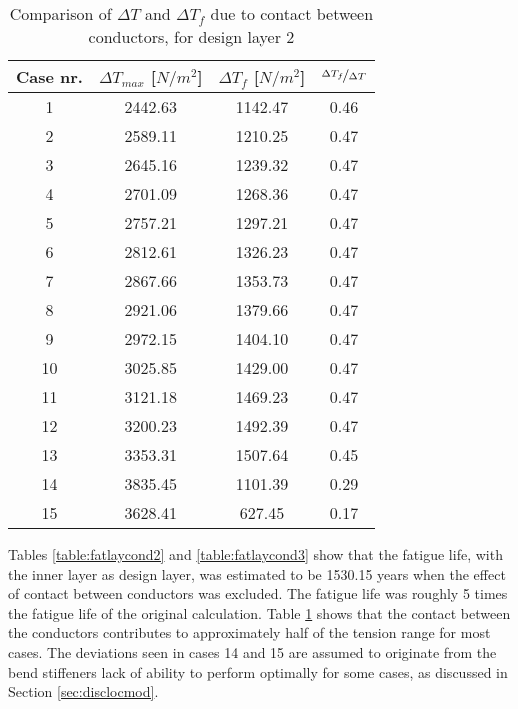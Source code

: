 \begin{table} [H]
\centering
\begin{tabular}{ |c|c|c|c|}
\hline
    Case nr.  & $\Delta T_{max}$ [$N/m^2$] & $\Delta T_f$ [$N/m^2$] & $\nicefrac{\Delta T_f}{\Delta T}$ \\ 
 \hline
 \hline
    1 & 2442.63 & 1142.47 & 0.46  \\ 
    2 & 2589.11 & 1210.25 & 0.47   \\ 
    3 & 2645.16 & 1239.32 & 0.47   \\ 
    4 & 2701.09 & 1268.36 & 0.47   \\
    5 & 2757.21 & 1297.21 & 0.47   \\ 
    6 & 2812.61 & 1326.23 & 0.47  \\ 
    7 & 2867.66 & 1353.73 & 0.47   \\ 
    8 & 2921.06 & 1379.66 & 0.47  \\ 
    9 & 2972.15 & 1404.10 & 0.47  \\ 
    10 & 3025.85 & 1429.00 & 0.47   \\ 
    11 & 3121.18 & 1469.23 & 0.47   \\ 
    12 & 3200.23 & 1492.39 & 0.47  \\ 
    13 & 3353.31 & 1507.64 & 0.45   \\ 
    14 & 3835.45 & 1101.39 & 0.29   \\ 
    15 & 3628.41 & 627.45 & 0.17   \\ 
\hline
\end{tabular}
\caption{Comparison of $\Delta T$ and $\Delta T_f$ due to contact between conductors, for design layer 2}
\label{table:tensfri}
\end{table}

Tables \ref{table:fatlaycond2} and \ref{table:fatlaycond3} show that the fatigue life, with the inner layer as design layer, was estimated to be 1530.15 years when the effect of contact between conductors was excluded. The fatigue life was roughly 5 times the fatigue life of the original calculation. Table \ref{table:tensfri} shows that the contact between the conductors contributes to approximately half of the tension range for most cases. The deviations seen in cases 14 and 15 are assumed to originate from the bend stiffeners lack of ability to perform optimally for some cases, as discussed in Section \ref{sec:disclocmod}. 

